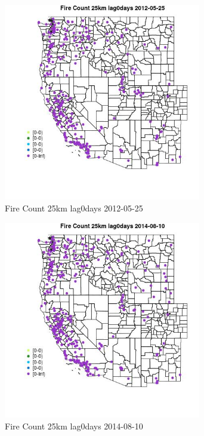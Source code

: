 \begin{figure} 
\centering  
\includegraphics[width=0.77\textwidth]{Code_Outputs/Report_ML_input_PM25_Step4_part_e_de_duplicated_aves_compiled_2019-05-18wNAs_MapObsFire_Count_25km_lag0days2012-05-25.jpg} 
\caption{\label{fig:Report_ML_input_PM25_Step4_part_e_de_duplicated_aves_compiled_2019-05-18wNAsMapObsFire_Count_25km_lag0days2012-05-25}Fire Count 25km lag0days 2012-05-25} 
\end{figure} 
 

\begin{figure} 
\centering  
\includegraphics[width=0.77\textwidth]{Code_Outputs/Report_ML_input_PM25_Step4_part_e_de_duplicated_aves_compiled_2019-05-18wNAs_MapObsFire_Count_25km_lag0days2014-08-10.jpg} 
\caption{\label{fig:Report_ML_input_PM25_Step4_part_e_de_duplicated_aves_compiled_2019-05-18wNAsMapObsFire_Count_25km_lag0days2014-08-10}Fire Count 25km lag0days 2014-08-10} 
\end{figure} 
 


